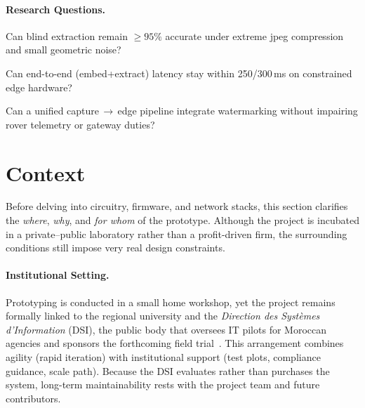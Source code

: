 \paragraph{Research Questions.}
\begin{description}[leftmargin=2.1cm,style=sameline]
  \item[RQ1] Can blind extraction remain $\ge 95\%$ accurate under extreme \gls{jpeg} compression and small geometric noise?
  \item[RQ2] Can end-to-end (embed+extract) latency stay within 250/300\,ms on constrained edge hardware?
  \item[RQ3] Can a unified capture\,$\rightarrow$\,edge pipeline integrate watermarking without impairing rover telemetry or gateway duties?
\end{description}

\section{Context}
\label{sec:intro:context}

Before delving into circuitry, firmware, and network stacks, this
section clarifies the \emph{where}, \emph{why}, and \emph{for whom} of
the prototype.
Although the project is incubated in a private–public
laboratory rather than a profit-driven firm, the surrounding conditions
still impose very real design constraints.

\paragraph{\textbf{Institutional Setting.}}
Prototyping is conducted in a small home workshop, yet the project
remains formally linked to the regional university and the
\emph{Direction des Systèmes d’Information} (DSI), the public body that
oversees IT pilots for Moroccan agencies and sponsors the forthcoming
field trial~\cite{dsi2025,ministereDSI2024}.
This arrangement combines agility (rapid iteration) with institutional support (test plots, compliance guidance, scale path).
Because the DSI evaluates rather than purchases the system, long-term maintainability rests with the project
team and future contributors.


